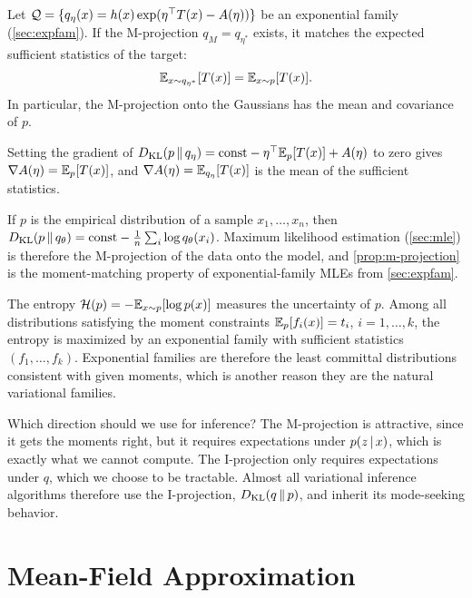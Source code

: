 \begin{proposition}\label{prop:m-projection}
Let $\mathcal{Q}=\{q_\eta(x)=h(x)\exp(\eta^{\top} T(x)-A(\eta))\}$ be an exponential family (\cref{sec:expfam}). If the M-projection $q_M=q_{\eta^*}$ exists, it matches the expected sufficient statistics of the target:
\[
\mathbb{E}_{x\sim q_{\eta^*}}[T(x)]=\mathbb{E}_{x\sim p}[T(x)].
\]
In particular, the M-projection onto the Gaussians has the mean and covariance of $p$.
\end{proposition}

Setting the gradient of $D_{\mathrm{KL}}(p\,\|\,q_\eta)=\text{const}-\eta^{\top}\mathbb{E}_p[T(x)]+A(\eta)$ to zero gives $\nabla A(\eta)=\mathbb{E}_p[T(x)]$, and $\nabla A(\eta)=\mathbb{E}_{q_\eta}[T(x)]$ is the mean of the sufficient statistics.

\begin{remark}\label{rem:mle-m-projection}
If $p$ is the empirical distribution of a sample $x_1,\dots,x_n$, then $D_{\mathrm{KL}}(p\,\|\,q_\theta)=\text{const}-\frac1n\sum_{i}\log q_\theta(x_i)$. Maximum likelihood estimation (\cref{sec:mle}) is therefore the M-projection of the data onto the model, and \cref{prop:m-projection} is the moment-matching property of exponential-family MLEs from \cref{sec:expfam}.
\end{remark}

\begin{remark}
The entropy $\mathcal{H}(p)=-\mathbb{E}_{x\sim p}[\log p(x)]$ measures the uncertainty of $p$. Among all distributions satisfying the moment constraints $\mathbb{E}_p[f_i(x)]=t_i$, $i=1,\dots,k$, the entropy is maximized by an exponential family with sufficient statistics $(f_1,\dots,f_k)$. Exponential families are therefore the least committal distributions consistent with given moments, which is another reason they are the natural variational families.
\end{remark}

Which direction should we use for inference? The M-projection is attractive, since it gets the moments right, but it requires expectations under $p(z\,|\, x)$, which is exactly what we cannot compute. The I-projection only requires expectations under $q$, which we choose to be tractable. Almost all variational inference algorithms therefore use the I-projection, $D_{\mathrm{KL}}(q\,\|\,p)$, and inherit its mode-seeking behavior.

\section{Mean-Field Approximation}\label{sec:mean-field}

